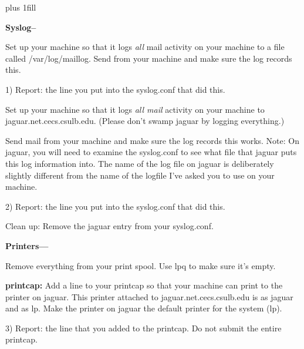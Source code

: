 
\rightskip=0pt plus 1fill

\parindent 0pt

{\bf Syslog--}

Set up your machine so that it logs {\it  all} mail activity 
on your machine to a file
called {\ltt{}/var/log/maillog}.
Send from your machine and make sure the log records this.

1) Report: the line you put into the syslog.conf that did this.

Set up your machine so that it logs {\it all mail} activity 
on your machine to 
{\ltt{}jaguar.net.cecs.csulb.edu}.
(Please don't swamp jaguar by logging everything.)

Send mail from your machine and make sure the log records this works.
Note: On {\ltt{}jaguar}, you will need to examine the {\ltt{}syslog.conf}
to see what file that {\ltt{}jaguar} puts this log information into.
The name of the log file on jaguar is deliberately slightly different from
the name of the logfile I've asked you to use on your machine.

2) Report: the line you put into the syslog.conf that did this.

Clean up: Remove the {\ltt{}jaguar} entry from your {\ltt{}syslog.conf}.


{\bf Printers---}

Remove everything from your print spool.
Use {\ltt{}lpq} to make sure it's empty.

{\bf printcap:}
Add a line to your printcap so that your machine can
print to the printer on jaguar.
This printer attached to {\ltt{}jaguar.net.cecs.csulb.edu} is
as {\ltt{}jaguar} and as {\ltt{}lp}.
Make the printer on {\ltt{}jaguar} the default printer for the system 
({\ltt{}lp}).

3) Report: the line that you added to the printcap. 
Do not submit the entire printcap.

\bye
